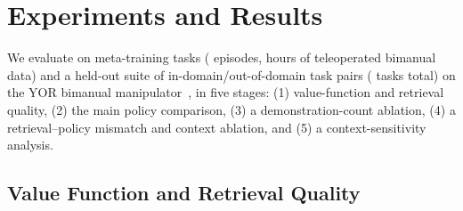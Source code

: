 
\providecommand{\gap}[1]{\textbf{[GAP: #1]}}

\section{Experiments and Results}
\label{sec:experiments}

We evaluate \method on \NumTasks{} meta-training tasks (\NumEpisodes{}
episodes, \NumTrainHours{} hours of teleoperated bimanual data) and a
held-out suite of \NumTaskPairs{} in-domain/out-of-domain task pairs
(\NumEvalTasks{} tasks total) on the YOR bimanual manipulator~\cite{yor}, in
five stages: (1) value-function and retrieval quality, (2) the main policy
comparison, (3) a demonstration-count ablation, (4) a retrieval--policy
mismatch and context ablation, and (5) a context-sensitivity analysis.

\subsection{Value Function and Retrieval Quality}
\label{sec:vfe-retrieval-quality}

